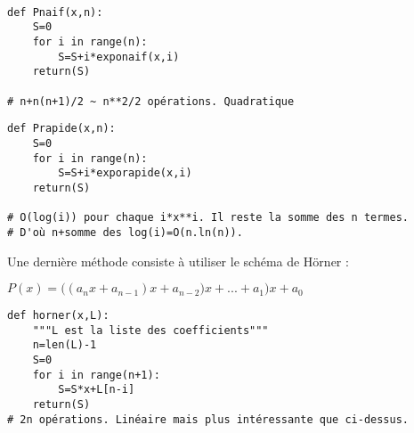 \ifprof
\begin{corrige}
\begin{lstlisting}

def Pnaif(x,n):
    S=0
    for i in range(n):
        S=S+i*exponaif(x,i)
    return(S)

# n+n(n+1)/2 ~ n**2/2 opérations. Quadratique

\end{lstlisting}
\end{corrige}
\else
\fi

\ifprof
\begin{corrige}
\begin{lstlisting}
def Prapide(x,n):
    S=0
    for i in range(n):
        S=S+i*exporapide(x,i)
    return(S)

# O(log(i)) pour chaque i*x**i. Il reste la somme des n termes.
# D'où n+somme des log(i)=O(n.ln(n)).
\end{lstlisting}
\end{corrige}
\else
\fi
	
\ifprof
\else
 Une dernière méthode consiste à utiliser le schéma de Hörner :
 
 $P(x)= ({(a_nx+a_{n-1})x+a_{n-2})x+...+a_1)x+a_0}$
\fi

\ifprof
\begin{corrige}
\begin{lstlisting}
def horner(x,L):
    """L est la liste des coefficients"""
    n=len(L)-1
    S=0
    for i in range(n+1):
        S=S*x+L[n-i]
    return(S)
# 2n opérations. Linéaire mais plus intéressante que ci-dessus.
\end{lstlisting}
\end{corrige}
\else
\fi


